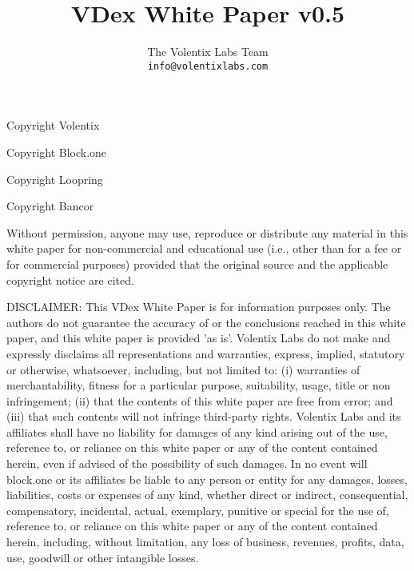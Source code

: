 \documentclass[]{article}
\title{VDex White Paper v0.5}
\author{
		The Volentix Labs Team\\
	\texttt{info@volentixlabs.com}
}
\begin{document}
\tableofcontents
\maketitle
\begin{description}
\item Copyright  Volentix
\item Copyright  Block.one
\item Copyright  Loopring
\item Copyright  Bancor
\end{description}

{\tiny Without permission, anyone may use, reproduce or distribute any material in this white paper for non-commercial and educational use (i.e., other than for a fee or for commercial purposes) provided that the original source and the applicable copyright notice are cited.

DISCLAIMER: This VDex White Paper  is for information purposes only. The authors do not guarantee the accuracy of or the conclusions reached in this white paper, and this white paper is provided 'as is'. 
Volentix Labs do not make and expressly disclaims all representations and warranties, express, implied, statutory or otherwise, whatsoever, including, but not limited to: (i) warranties of merchantability, fitness for a particular purpose, suitability, usage, title or non infringement; (ii) that the contents of this white paper are free from error; and (iii) that such contents will not infringe third-party rights. Volentix Labs and its affiliates shall have no liability for damages of any kind arising out of the use, reference to, or reliance on this white paper or any of the content contained herein, even if advised of the possibility of such damages. In no event will block.one or its affiliates be liable to any person or entity for any damages, losses, liabilities, costs or expenses of any kind, whether direct or indirect, consequential, compensatory, incidental, actual, exemplary, punitive or special for the use of, reference to, or reliance on this white paper or any of the content contained herein, including, without limitation, any loss of business, revenues, profits, data, use, goodwill or other intangible losses.}
\end{document}
